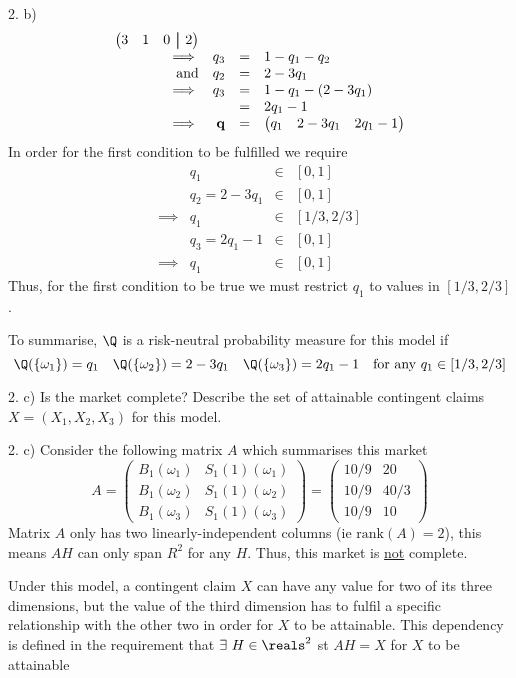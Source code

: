 \documentclass[11pt,a4paper]{article}
\newcommand\aug{\fboxsep=-\fboxrule\!\!\!\fbox{\strut}\!\!\!}
\begin{document}
\begin{answer}{2. b)}
\[\begin{array}{rrcl}
\begin{pmatrix}
      3&1&0&\aug&2
    \end{pmatrix}\\
    \implies&q_3&=&1-q_1-q_2\\
    \text{and}&q_2&=&2-3q_1\\
    \implies&q_3&=&1-q_1-(2-3q_1)\\
    &&=&2q_1-1\\
    \implies&\mathbf{q}&=&\begin{pmatrix}
      q_1&2-3q_1&2q_1-1
    \end{pmatrix}
  \end{array}\]
  In order for the first condition to be fulfilled we require
  \[\begin{array}{rrcl}
    &q_1&\in&[0,1]\\
    &q_2=2-3q_1&\in&[0,1]\\
    \implies&q_1&\in&[1/3,2/3]\\
    &q_3=2q_1-1&\in&[0,1]\\
    \implies&q_1&\in&[0,1]
  \end{array}\]
  Thus, for the first condition to be true we must restrict $q_1$ to values in $[1/3,2/3]$.
  \par To summarise, $\Q$ is a risk-neutral probability measure for this model if
  \[ \Q(\{\omega_1\})=q_1\quad\Q(\{\omega_2\})=2-3q_1\quad\Q(\{\omega_3\})=2q_1-1\quad\text{for any }q_1\in[1/3,2/3] \]
\end{answer}

\begin{question}{2. c)}
  Is the market complete? Describe the set of attainable contingent claims $X=(X_1,X_2,X_3)$ for this model.
\end{question}

\begin{answer}{2. c)}
  Consider the following matrix $A$ which summarises this market
  \[ A=\begin{pmatrix}
    B_1(\omega_1)&S_1(1)(\omega_1)\\
    B_1(\omega_2)&S_1(1)(\omega_2)\\
    B_1(\omega_3)&S_1(1)(\omega_3)
  \end{pmatrix}=\begin{pmatrix}
    10/9&20\\
    10/9&40/3\\
    10/9&10
  \end{pmatrix}
  \]
  Matrix $A$ only has two linearly-independent columns (ie $\text{rank}(A)=2$), this means $AH$ can only span $R^2$ for any $H$. Thus, this market is \underline{not} complete.
  \par Under this model, a contingent claim $X$ can have any value for two of its three dimensions, but the value of the third dimension has to fulfil a specific relationship with the other two in order for $X$ to be attainable. This dependency is defined in the requirement that $\exists\ H\in\reals^2$ st $AH=X$ for $X$ to be attainable
\end{answer}
\end{document}

